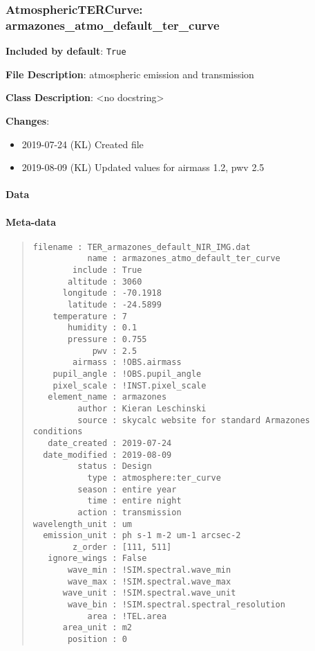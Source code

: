 \subsubsection{AtmosphericTERCurve: \textquotedbl{}armazones\_atmo\_default\_ter\_curve\textquotedbl{}%
  \label{atmospherictercurve-armazones-atmo-default-ter-curve}%
}

\textbf{Included by default}: \texttt{True}

\textbf{File Description}: atmospheric emission and transmission

\textbf{Class Description}: <no docstring>

\textbf{Changes}:

\begin{itemize}
\item 2019-07-24 (KL) Created file

\item 2019-08-09 (KL) Updated values for airmass 1.2, pwv 2.5
\end{itemize}


\paragraph{Data%
  \label{data}%
}


\paragraph{Meta-data%
  \label{meta-data}%
}

\begin{quote}
\begin{alltt}
\begin{lstlisting}[frame=single]
       filename : TER_armazones_default_NIR_IMG.dat
           name : armazones_atmo_default_ter_curve
        include : True
       altitude : 3060
      longitude : -70.1918
       latitude : -24.5899
    temperature : 7
       humidity : 0.1
       pressure : 0.755
            pwv : 2.5
        airmass : !OBS.airmass
    pupil_angle : !OBS.pupil_angle
    pixel_scale : !INST.pixel_scale
   element_name : armazones
         author : Kieran Leschinski
         source : skycalc website for standard Armazones conditions
   date_created : 2019-07-24
  date_modified : 2019-08-09
         status : Design
           type : atmosphere:ter_curve
         season : entire year
           time : entire night
         action : transmission
wavelength_unit : um
  emission_unit : ph s-1 m-2 um-1 arcsec-2
        z_order : [111, 511]
   ignore_wings : False
       wave_min : !SIM.spectral.wave_min
       wave_max : !SIM.spectral.wave_max
      wave_unit : !SIM.spectral.wave_unit
       wave_bin : !SIM.spectral.spectral_resolution
           area : !TEL.area
      area_unit : m2
       position : 0
\end{lstlisting}
\end{alltt}
\end{quote}


